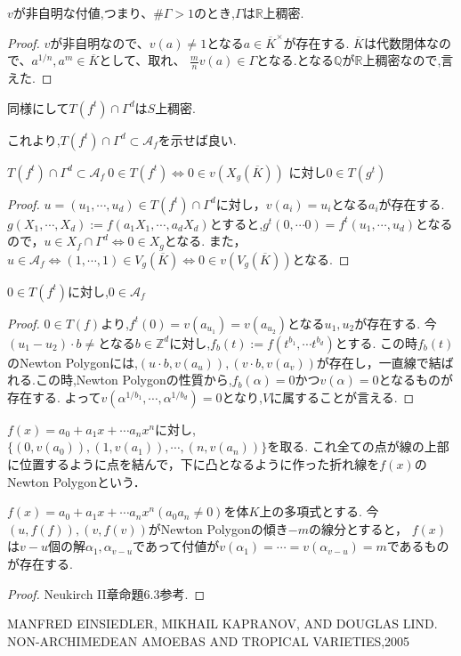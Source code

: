 \documentclass{ujarticle}
\begin{document}
\begin{lem}
 $v$が非自明な付値,つまり、$\# \Gamma >1$のとき,$\Gamma$は$\mathbb{R}$上稠密.
\end{lem}
\begin{proof}
 $v$が非自明なので、$v(a) \neq 1$となる$a \in  \overline{K}^{\times}$が存在する.
 $\overline{K}$は代数閉体なので、$a^{1/n} , a^m \in \overline{K}$として、取れ、
 $\frac{m}{n}v(a) \in \Gamma$となる.となる$\mathbb{Q}$が$\mathbb{R}$上稠密なので,言えた.
\end{proof}
\begin{rem}
 同様にして$T(f^t) \cap \Gamma^d$は$S$上稠密.
\end{rem}
これより,$T(f^t) \cap \Gamma^d \subset \mathcal{A}_f$を示せば良い.

\begin{lem}
  $T(f^t) \cap \Gamma^d \subset \mathcal{A}_f \ 0 \in T(f^t) \Leftrightarrow 0 \in v(X_g(\overline{K}))$
  に対し$0 \in T(g^t)$
\end{lem}
\begin{proof}
  $u = (u_1,\cdots,u_d )\in T(f^t) \cap \Gamma^d$に対し，$ v(a_i ) = u_i $となる$a_i$が存在する.
  $g(X_1,\cdots ,X_d):= f(a_1X_1,\cdots,a_dX_d)$とすると,$g^t (0,\cdots 0) = f^t(u_1,\cdots ,u_d)$となるので，$u \in X_f \cap \Gamma^d \Leftrightarrow 0 \in X_g$となる.
  また，$u \in \mathcal{A}_f \Leftrightarrow (1,\cdots,1) \in V_g(\overline{K}) \Leftrightarrow  0 \in  v(V_g(\overline{K}))$となる.
\end{proof}
\begin{lem}
  $0 \in T(f^t)$に対し,$ 0 \in \mathcal{A}_f$
\end{lem}
\begin{proof}
  $0 \in T(f)$より,$f^t(0) = v(a_{u_1}) = v(a_{u_2})$となる$u_1,u_2$が存在する.
  今$(u_1-u_2)\cdot b \neq$となる$b \in \mathbb{Z}^d$に対し,$f_b(t):= f(t^{b_1},\cdots t^{b_d})$とする.
  この時$f_b(t)$のNewton Polygonには,$(u\cdot b ,v(a_u)),(v \cdot b, v(a_v))$が存在し，一直線で結ばれる.この時,Newton Polygonの性質から,$f_b(\alpha)=0$かつ$v(\alpha)=0$となるものが存在する.
  よって$v(\alpha^{1/b_1},\cdots,\alpha^{1/b_d})= 0$となり,$V$に属することが言える.
\end{proof}
\begin{dfn}
 $f(x) = a_0 + a_1 x + \cdots a_nx^n$に対し,
 $\{ (0,v(a_0)),(1,v(a_1)),\cdots,(n,v(a_n)) \}$を取る.
 これ全ての点が線の上部に位置するように点を結んで，下に凸となるように作った折れ線を$f(x)$のNewton Polygonという．
\end{dfn}
\begin{lem}
$f(x) = a_0 + a_1 x + \cdots a_nx^n(a_0a_n \neq 0)$を体$K$上の多項式とする.
今$(u,f(f)),(v,f(v))$がNewton Polygonの傾き$-m$の線分とすると，
$f(x)$は$v-u$個の解$\alpha_1,\alpha_{v-u}$であって付値が$v(\alpha_1) =\cdots= v(\alpha_{v-u})=m$であるものが存在する.
\end{lem}
\begin{proof}
 Neukirch II章命題6.3参考.
\end{proof}

\begin{thebibliography}{数字}
MANFRED EINSIEDLER, MIKHAIL KAPRANOV, AND DOUGLAS LIND. NON-ARCHIMEDEAN AMOEBAS
AND TROPICAL VARIETIES,2005
\end{thebibliography}
\end{document}
